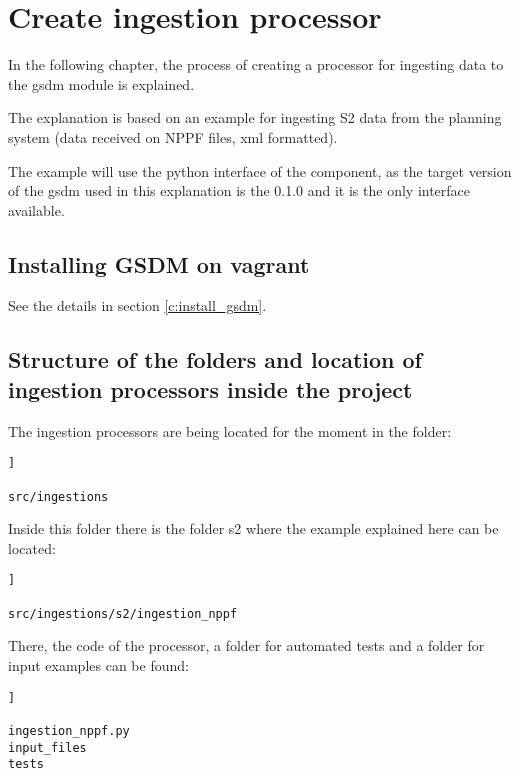 \chapter{Create ingestion processor}

In the following chapter, the process of creating a processor for ingesting data to the gsdm module is explained.

The explanation is based on an example for ingesting S2 data from the planning system (data received on NPPF files, xml formatted).

The example will use the python interface of the component, as the target version of the gsdm used in this explanation is the 0.1.0 and it is the only interface available.

\section{Installing GSDM on vagrant}

See the details in section \ref{c:install_gsdm}.

\section{Structure of the folders and location of ingestion processors inside the project}

The ingestion processors are being located for the moment in the folder:

\begin{lstlisting}[breaklines=true, style=bash]]

src/ingestions

\end{lstlisting}

Inside this folder there is the folder s2 where the example explained here can be located:

\begin{lstlisting}[breaklines=true, style=bash]]

src/ingestions/s2/ingestion_nppf

\end{lstlisting}

There, the code of the processor, a folder for automated tests and a folder for input examples can be found:

\begin{lstlisting}[breaklines=true, style=bash]]

ingestion_nppf.py
input_files
tests

\end{lstlisting}

